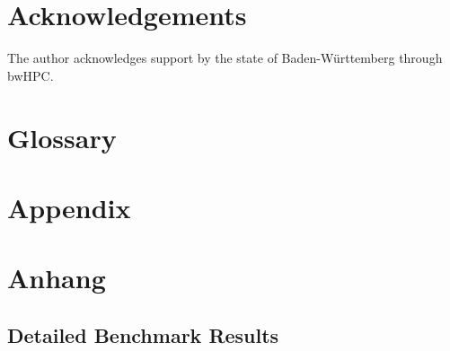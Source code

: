 
\chapter{Acknowledgements}
The author acknowledges support by the state of Baden-Württemberg through bwHPC.

\chapter{Glossary}
\printglossary[type=\acronymtype]
\printglossary

{\chapter{Appendix}}    %
{\chapter{Anhang}}      %
\label{chap:appendix}

\section{Detailed Benchmark Results}

